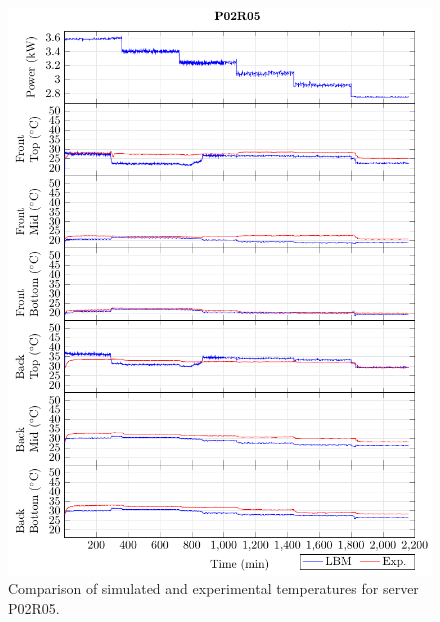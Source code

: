 \begin{figure}[!htb]
\centering
\includegraphics[width=\linewidth]{Plots/P02R05_T.pdf}
\caption{Comparison of simulated and experimental temperatures for server P02R05.}
\label{fig:P02R05_plot}
\end{figure}

\clearpage

